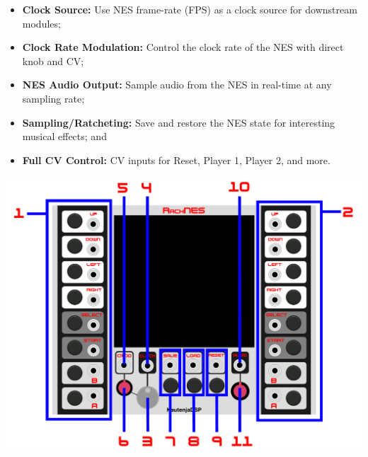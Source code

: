 \documentclass[12pt,a4paper]{article}
\begin{document}
\begin{itemize}
  \item \textbf{Clock Source:} Use NES frame-rate (FPS) as a clock source for downstream modules;
  \item \textbf{Clock Rate Modulation:} Control the clock rate of the NES with direct knob and CV;
  \item \textbf{NES Audio Output:} Sample audio from the NES in real-time at any sampling rate;
  \item \textbf{Sampling/Ratcheting:} Save and restore the NES state for interesting musical effects; and
  \item \textbf{Full CV Control:} CV inputs for Reset, Player 1, Player 2, and more.
\end{itemize}


\includegraphics[width=\textwidth]{RackNES-Manual}
\clearpage
\end{document}
